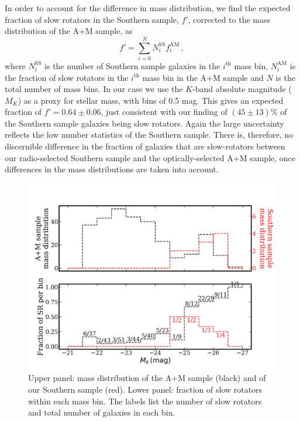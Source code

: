 \documentclass[a4paper,fleqn,usenatbib]{mnras}
\begin{document}
		In order to account for the difference in mass distribution, we find the expected fraction of slow rotators in the Southern sample, $f'$, corrected to the mass distribution of the A+M sample, as
		\begin{equation}
			f' = \sum_{i=0}^N N^\text{SS}_i f^\text{AM}_i \, , 
		\end{equation}
		where $N^\text{SS}_i$ is the number of Southern sample galaxies in the $i^\text{th}$ mass bin, $N^\text{AM}_i$ is the fraction of slow rotators in the $i^\text{th}$ mass bin in the A+M sample and $N$ is the total number of mass bins. In our case we use the $K$-band absolute magnitude ($M_K$) as a proxy for stellar mass, with bins of 0.5 mag. This gives an expected fraction of $f' = 0.64 \pm 0.06$, just consistent with our finding of $(45\pm13)$\% of the Southern sample galaxies being slow rotators. Again the large uncertainty reflects the low number statistics of the Southern sample. There is, therefore, no discernible difference in the fraction of galaxies that are slow-rotators between our radio-selected Southern sample and the optically-selected A+M sample, once differences in the mass distributions are taken into account. 

		\begin{figure}
			\includegraphics[width=\columnwidth]{M_k_binned.png}
			\caption{Upper panel: mass distribution of the A+M sample (black) and of our Southern sample (red). Lower panel: fraction of slow rotators within each mass bin. The labels list the number of slow rotators and total number of galaxies in each bin.}
			\label{fig:SRmassFraction}
		\end{figure}
\end{document}
